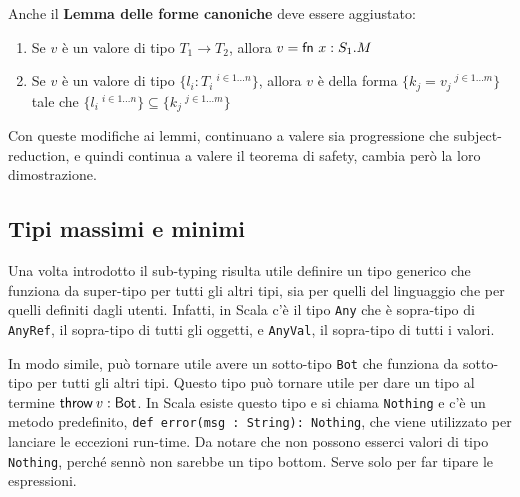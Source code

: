 \noindent Anche il \textbf{Lemma delle forme canoniche} deve essere aggiustato:

\begin{enumerate}
	\item Se $v$ è un valore di tipo $T_1 \to T_2$, allora $v = \fn x : S_1.M$
	\item Se $v$ è un valore di tipo $ \{ l_i : T_i \:^{i \in 1 \ldots n} \} $, allora $v$ è della forma $\{ k_j = v_j \:^{j \in 1 \ldots m} \}$ tale che $\{ l_i \:^{i \in 1\ldots n} \} \subseteq \{ k_j \:^{j \in 1\ldots m} \}$
\end{enumerate}

\noindent Con queste modifiche ai lemmi, continuano a valere sia progressione che subject-reduction, e quindi continua a valere il teorema di safety, cambia però la loro dimostrazione.

\subsection{Tipi massimi e minimi}

Una volta introdotto il sub-typing risulta utile definire un tipo generico che funziona da super-tipo per tutti gli altri tipi, sia per quelli del linguaggio che per quelli definiti dagli utenti.
Infatti, in Scala c'è il tipo \texttt{Any} che è sopra-tipo di \texttt{AnyRef}, il sopra-tipo di tutti gli oggetti, e \texttt{AnyVal}, il sopra-tipo di tutti i valori.

In modo simile, può tornare utile avere un sotto-tipo \texttt{Bot} che funziona da sotto-tipo per tutti gli altri tipi. 
Questo tipo può tornare utile per dare un tipo al termine $\throw{v}: \text{Bot}$. In Scala esiste questo tipo e si chiama \texttt{Nothing} e c'è un metodo predefinito, \texttt{def error(msg : String): Nothing}, che viene utilizzato per lanciare le eccezioni run-time. 
Da notare che non possono esserci valori di tipo \texttt{Nothing}, perché sennò non sarebbe un tipo bottom. 
Serve solo per far tipare le espressioni.




